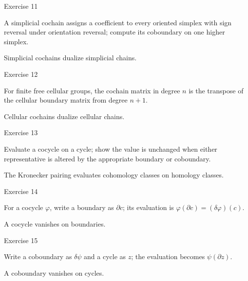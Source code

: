 \begin{exercise}\label{exr:viii28-11}
Exercise 11
\end{exercise}
\begin{hint}
A simplicial cochain assigns a coefficient to every oriented simplex with sign reversal under orientation reversal; compute its coboundary on one higher simplex.
\end{hint}
\begin{solution}
Simplicial cochains dualize simplicial chains.
\end{solution}

\begin{exercise}\label{exr:viii28-12}
Exercise 12
\end{exercise}
\begin{hint}
For finite free cellular groups, the cochain matrix in degree \(n\) is the transpose of the cellular boundary matrix from degree \(n+1\).
\end{hint}
\begin{solution}
Cellular cochains dualize cellular chains.
\end{solution}

\begin{exercise}\label{exr:viii28-13}
Exercise 13
\end{exercise}
\begin{hint}
Evaluate a cocycle on a cycle; show the value is unchanged when either representative is altered by the appropriate boundary or coboundary.
\end{hint}
\begin{solution}
The Kronecker pairing evaluates cohomology classes on homology classes.
\end{solution}

\begin{exercise}\label{exr:viii28-14}
Exercise 14
\end{exercise}
\begin{hint}
For a cocycle \(\varphi\), write a boundary as \(\partial c\); its evaluation is \(\varphi(\partial c)=(\delta\varphi)(c)\).
\end{hint}
\begin{solution}
A cocycle vanishes on boundaries.
\end{solution}

\begin{exercise}\label{exr:viii28-15}
Exercise 15
\end{exercise}
\begin{hint}
Write a coboundary as \(\delta\psi\) and a cycle as \(z\); the evaluation becomes \(\psi(\partial z)\).
\end{hint}
\begin{solution}
A coboundary vanishes on cycles.
\end{solution}

